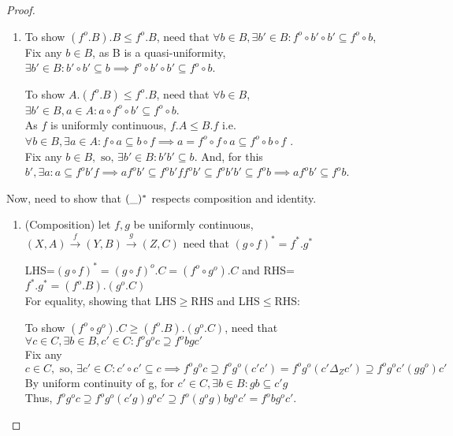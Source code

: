\documentclass[a4paper]{article}
\theoremstyle{definition}
\begin{document}
\begin{proof}
\begin{enumerate}[label=(\roman*)]
			\item	To show $(f^o .B).B \leq f^o .B$, need that $\forall b \in B,
				\exists b' \in B : f^o \circ b' \circ b' \subseteq f^o \circ b$,\\
				Fix any $b \in B$, as B is a quasi-uniformity, $\exists b' \in B : b' \circ b' \subseteq b
				\implies f^o \circ b'\circ b' \subseteq f^o \circ b$.

				To show $A.(f^o .B) \leq f^o .B$, need that $\forall b \in B$,
				$\exists b' \in B, a\in A : a \circ f^o \circ b' \subseteq f^o \circ b$.\\
				As $f$ is uniformly continuous, $f.A\leq B.f$ i.e. $\forall b \in B, \exists a \in A
				: f \circ a \subseteq b \circ f
				\implies a= f^o \circ f \circ a \subseteq f^o \circ  b \circ f $   .\\
				Fix any $b \in B, \text{ so, } \exists b' \in B : b'b' \subseteq b$.
				And, for this $b', \exists a : a \subseteq f^ob'f \implies af^ob' \subseteq f^ob'ff^ob'
				\subseteq f^o b'b' \subseteq f^o b \implies af^ob' \subseteq f^o b$.\\
				\end{enumerate}
			\item	Now, need to show that $(\string _)^*$ respects composition and identity.
				\begin{enumerate}[label=(\roman*)]
					\item (Composition) let $f,g$ be uniformly continuous,
						$(X,A) \xrightarrow{f} (Y,B) \xrightarrow{g} (Z,C)$
						need that $(g \circ f)^*= f^*.g^* $

						LHS=$(g \circ f)^*=(g \circ f)^o .C=(f^o \circ g^o).C$ and
						RHS=$f^*.g^* =(f^o .B).(g^o .C)$\\
						For equality, showing that LHS$\geq$RHS and LHS$\leq$RHS:

						To show $(f^o \circ g^o).C\geq(f^o .B).(g^o .C)$, need that
						$\forall c \in C, \exists b \in B, c' \in C : f^og^oc
						\supseteq f^obgc'$ \\
						Fix any $c \in C, \text{ so, } \exists c' \in C: c' \circ c' \subseteq c
						\implies f^o g^o c \supseteq f^o g^o (c'c')
						=f^o g^o (c' \Delta_Z c') \supseteq f^o g^o c'(gg^o)c'$ \\
						By uniform continuity of g, for $c'\in C,\exists b\in B: gb\subseteq c'g $
						\\Thus, $f^o g^o c \supseteq f^o g^o (c'g)g^oc' \supseteq
						f^o (g^o g)bg^o c'=f^o bg^o c'$.


\end{enumerate}
\end{proof}
\end{document}
